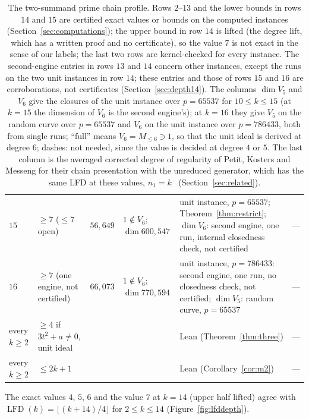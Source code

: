 \documentclass[11pt]{article}
\theoremstyle{definition}\newtheorem{definition}[theorem]{Definition}
\theoremstyle{remark}\newtheorem{remark}[theorem]{Remark}
\newcommand{\lfd}{\operatorname{LFD}}
\begin{document}
\begin{table}[tp]
\begin{tabular}{@{}lR{3.0cm}rR{2.0cm}R{6.2cm}l@{}}
$15$ & $\ge7$ ($\le7$ open) & $56{,}649$ & $1\notin V_6$; $\dim 600{,}547$ & unit instance, $p=65537$; Theorem~\ref{thm:restrict}; $\dim V_6$: second engine, one run, internal closedness check, not certified & ---\\
$16$ & $\ge7$ (one engine, not certified) & $66{,}073$ & $1\notin V_6$; $\dim 770{,}594$ & unit instance, $p=786433$: second engine, one run, no closedness check, not certified; $\dim V_5$: random curve, $p=65537$ & ---\\
every $k\ge2$ & $\ge4$ if $3t^2+a\ne0$, unit ideal & & & Lean (Theorem~\ref{thm:three}) & ---\\
every $k\ge2$ & $\le2k+1$ & & & Lean (Corollary~\ref{cor:m2}) & ---\\
\bottomrule
\end{tabular}
\caption{The two-summand prime chain profile. Rows $2$--$13$ and the lower
bounds in rows $14$ and $15$ are certified exact values or bounds on the
computed instances (Section~\ref{sec:computations}); the upper bound in row
$14$ is lifted (the degree lift, which has a written proof and no
certificate), so the value $7$ is not exact in the sense of our labels; the
last two rows are kernel-checked for every instance. The second-engine
entries in rows $13$ and $14$ concern other instances, except the runs on the
two unit instances in row $14$; these entries and those of rows $15$ and
$16$ are corroborations, not certificates (Section~\ref{sec:depth14}). The columns $\dim V_5$ and $V_6$ give the
closures of the unit instance over $p=65537$ for $10\le k\le15$ (at
$k=15$ the dimension of $V_6$ is the second engine's); at $k=16$ they give
$V_5$ on the random curve over $p=65537$ and $V_6$ on the unit instance
over $p=786433$, both from single runs; ``full'' means
$V_6=M_{\le6}\ni1$, so that the unit ideal is derived at degree $6$;
dashes: not needed, since the value is decided at degree $4$ or $5$. The
last column is the averaged corrected degree of regularity of Petit,
Kosters and Messeng for their chain presentation with the unreduced
generator, which has the same LFD at these values, $n_1=k$~\cite[Table~4]{pkm}
(Section~\ref{sec:related}).}
\label{tab:profile}
\end{table}

The exact values $4$, $5$, $6$ and the value $7$ at $k=14$ (upper half
lifted) agree with $\lfd(k)=\lfloor(k+14)/4\rfloor$ for $2\le k\le14$
(Figure~\ref{fig:lfddepth}).
\end{document}
